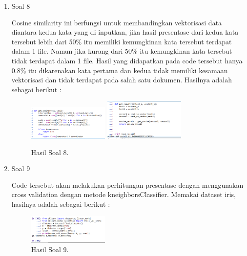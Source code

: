 \begin{enumerate}
	\item Soal 8
	\hfill\break
	
	Cosine similarity ini berfungsi untuk membandingkan vektorisasi data diantara kedua kata yang di inputkan, jika hasil presentase dari kedua kata tersebut lebih dari 50\% itu memiliki kemungkinan kata tersebut terdapat dalam 1 file. Namun jika kurang dari 50\% itu kemungkinan kata tersebut tidak terdapat dalam 1 file. Hasil yang didapatkan pada code tersebut hanya 0.8\% itu dikarenakan kata pertama dan kedua tidak memiliki kesamaan vektorisasi dan tidak terdapat pada salah satu dokumen. Hasilnya adalah sebagai berikut :
	\begin{figure}[H]
	\centering
		\includegraphics[width=4cm]{figures/1174095/tugas5/h27.PNG}
		\includegraphics[width=4cm]{figures/1174095/tugas5/h28.PNG}
		\caption{Hasil Soal 8.}
	\end{figure}

	\item Soal 9
	\hfill\break
	
	Code tersebut akan melakukan perhitungan presentase dengan menggunakan cross validation dengan metode kneighborsClassifier. Memakai dataset iris, hasilnya adalah sebagai berikut :
	\begin{figure}[H]
	\centering
		\includegraphics[width=4cm]{figures/1174095/tugas5/h29.PNG}
		\caption{Hasil Soal 9.}
	\end{figure}
\end{enumerate}

